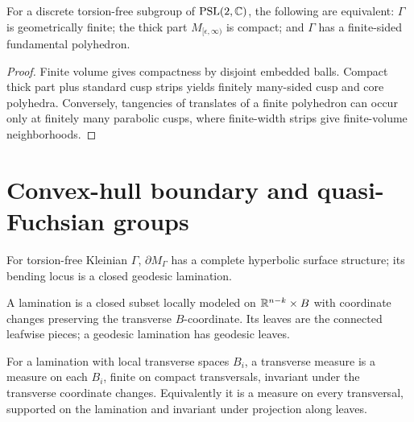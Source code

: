 \begin{proposition}
\label{thurston-ch08-geometric-finiteness-equivalences}
For a discrete torsion-free subgroup of $\operatorname{PSL}(2,\mathbb{C})$, the following are equivalent: $\Gamma$ is geometrically finite; the thick part $M_{[\epsilon,\infty)}$ is compact; and $\Gamma$ has a finite-sided fundamental polyhedron.
\end{proposition}
\begin{proof}\sketch Finite volume gives compactness by disjoint embedded balls.  Compact thick part plus standard cusp strips yields finitely many-sided cusp and core polyhedra.  Conversely, tangencies of translates of a finite polyhedron can occur only at finitely many parabolic cusps, where finite-width strips give finite-volume neighborhoods.\end{proof}

\section{Convex-hull boundary and quasi-Fuchsian groups}

\begin{proposition}
\label{thurston-ch08-convex-boundary-surface}
For torsion-free Kleinian $\Gamma$, $\partial M_\Gamma$ has a complete hyperbolic surface structure; its bending locus is a closed geodesic lamination.
\end{proposition}

\begin{definition}[Lamination]
\label{thurston-ch08-lamination}
A lamination is a closed subset locally modeled on $\mathbb{R}^{n-k}\times B$ with coordinate changes preserving the transverse $B$-coordinate.  Its leaves are the connected leafwise pieces; a geodesic lamination has geodesic leaves.
\end{definition}

\begin{definition}
\label{thurston-ch08-transverse-measure}
For a lamination with local transverse spaces $B_i$, a transverse measure is a measure on each $B_i$, finite on compact transversals, invariant under the transverse coordinate changes.  Equivalently it is a measure on every transversal, supported on the lamination and invariant under projection along leaves.
\end{definition}

